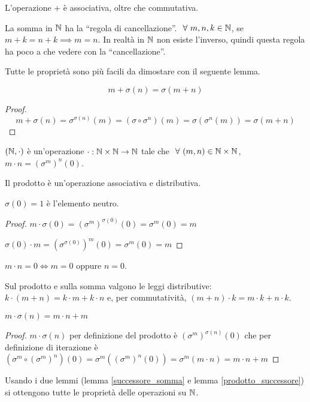 L'operazione + \`e associativa, oltre che commutativa. 

La somma in $\mathbb{N}$ ha la ``regola di cancellazione''. $\forall m, n, k \in \naturals$, se $m + k = n + k \implies m = n$. In realt\`a in $\mathbb{N}$ non esiste l'inverso, quindi questa regola ha poco a che vedere con la ``cancellazione''.

Tutte le propriet\`a sono pi\`u facili da dimostare con il seguente lemma.
\begin{lem}\label{successore_somma}
\[
m + \sigma (n) = \sigma(m + n)
\]
\end{lem}
\begin{proof}
\[
m + \sigma(n) = \sigma^{\sigma(n)} (m) = (\sigma \circ \sigma^n) (m) = \sigma ( \sigma^n (m) ) = \sigma(m + n)
\]
\end{proof}
\begin{defn}
$(\mathbb{N}, \cdot)$ \`e un'operazione $\cdot : \mathbb{N} \times \mathbb{N} \to \mathbb{N}$ tale che $\forall (m, n) \in \naturals \times \naturals$, $m \cdot n = (\sigma^m)^n(0)$.
\end{defn}
Il prodotto \`e un'operazione associativa e distributiva.

\begin{prop}
$\sigma(0) = 1$ \`e l'elemento neutro.
\end{prop}
\begin{proof}
$m \cdot \sigma(0) = (\sigma^m)^{\sigma(0)} (0) = \sigma^m (0) = m$

$\sigma(0) \cdot m = (\sigma^{\sigma(0)})^m (0) = \sigma^m (0) = m$
\end{proof}

\begin{defn}
$m \cdot n = 0 \iff m = 0 $ oppure $ n = 0 $.
\end{defn}

Sul prodotto e sulla somma valgono le leggi distributive: $k \cdot (m+n) = k \cdot m + k \cdot n$ e, per commutativit\`a, $(m + n) \cdot k = m \cdot k + n \cdot k$.
\begin{lem}\label{prodotto_successore}
$m \cdot \sigma(n) = m \cdot n + m$
\end{lem}
\begin{proof}
$m \cdot \sigma(n)$ per definizione del prodotto \`e $ (\sigma^m)^{\sigma(n)} (0) $ che per definizione di iterazione \`e $ (\sigma^m \circ (\sigma^m)^n) (0) = \sigma^m ( (\sigma^m)^n (0)) = \sigma^m (m \cdot n) = m \cdot n + m$
\end{proof}
Usando i due lemmi (lemma \ref{successore_somma} e lemma \ref{prodotto_successore}) si ottengono tutte le propriet\`a delle operazioni su $\mathbb{N}$.

